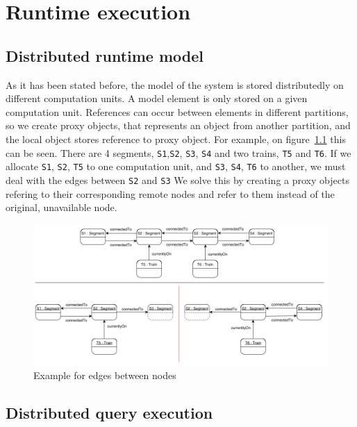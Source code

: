 %
\chapter{Runtime execution}
%


\section{Distributed runtime model}

As it has been stated before, the model of the system is stored distributedly on different computation units. A model element is only stored on a given computation unit. References can occur between elements in different partitions, so we create proxy objects, that represents an object from another partition, and the local object stores reference to proxy object. For example, on figure~\ref{fig:distrib-model-example} this can be seen. There are 4 segments, \texttt{S1},\texttt{S2}, \texttt{S3}, \texttt{S4} and two trains, \texttt{T5} and \texttt{T6}. If we allocate \texttt{S1}, \texttt{S2}, \texttt{T5} to one computation unit, and \texttt{S3}, \texttt{S4}, \texttt{T6} to another, we must deal with the edges between \texttt{S2} and \texttt{S3} We solve this by creating a proxy objects refering to their corresponding remote nodes and refer to them instead of the original, unavailable node.

\begin{figure}[h]
	\begin{center}
		\includegraphics[width=\textwidth]{figures/distributed-model.PNG}
		\caption{Example for edges between nodes}
		\label{fig:distrib-model-example}
	\end{center}
\end{figure}




\section{Distributed query execution}


